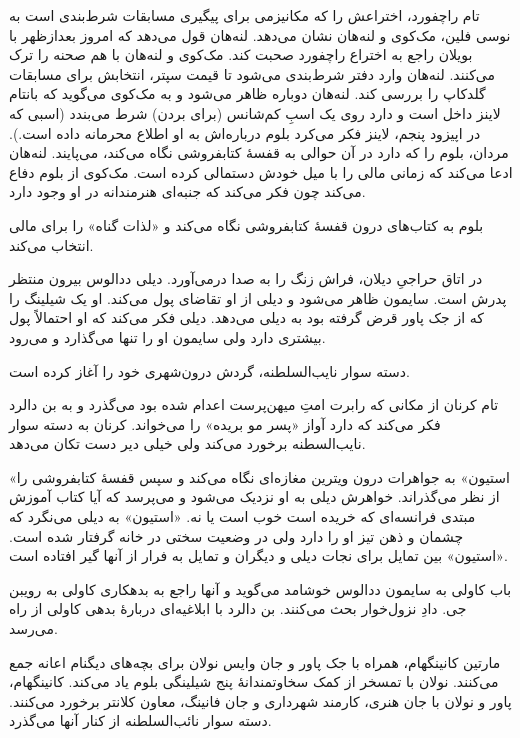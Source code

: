 \documentclass[12pt]{book}
\newcommand{\noun}[1]{«{#1}»}
\begin{document}
    تام راچفورد، اختراعش را که مکانیزمی برای پیگیری مسابقات شرط‌بندی است به نوسی فلین، مک‌کوی و لنه‌هان نشان می‌دهد. لنه‌هان قول می‌دهد که امروز بعدازظهر با  بویلان راجع به اختراع راچفورد صحبت کند. مک‌کوی و لنه‌هان با هم صحنه را ترک می‌کنند. لنه‌هان وارد دفتر شرط‌بندی می‌شود تا قیمت سپتر، انتخابش برای مسابقات گلدکاپ را بررسی کند. لنه‌هان دوباره ظاهر می‌شود و به مک‌کوی می‌گوید که بانتام لاینز داخل است و دارد روی یک اسبِ کم‌شانس (برای بردن) شرط می‌بندد (اسبی که در اپیزود پنجم، لاینز فکر می‌کرد بلوم درباره‌اش به او اطلاع محرمانه داده است.). مردان، بلوم را که دارد در آن حوالی به قفسۀ کتابفروشی نگاه می‌کند، می‌پایند. لنه‌هان ادعا می‌کند که زمانی مالی را با میل خودش دستمالی کرده است. مک‌کوی از بلوم دفاع می‌کند چون فکر می‌کند که جنبه‌ای هنرمندانه در او وجود دارد.

    بلوم به کتاب‌های درون قفسۀ کتابفروشی نگاه می‌کند و «لذات گناه» را برای مالی انتخاب می‌کند.

    در اتاق حراجیِ دیلان، فراش زنگ را به صدا درمی‌آورد. دیلی ددالوس بیرون منتظر پدرش است. سایمون ظاهر می‌شود و دیلی از او تقاضای پول می‌کند. او یک شیلینگ را که از جک پاور قرض گرفته بود به دیلی می‌دهد. دیلی فکر می‌کند که او احتمالاً پول بیشتری دارد ولی سایمون او را تنها می‌گذارد و می‌رود.

    دسته سوار نایب‌السلطنه، گردش درون‌شهری خود را آغاز کرده است.

    تام کرنان از مکانی که رابرت امتِ میهن‌پرست اعدام شده بود می‌گذرد و به بن دالرد فکر می‌کند که دارد آواز «پسر مو بریده» را می‌خواند. کرنان به دسته سوار نایب‌السطنه برخورد می‌کند ولی خیلی دیر دست تکان می‌دهد.

    \noun{استیون} به جواهرات درون ویترین مغازه‌ای نگاه می‌کند و سپس قفسۀ کتابفروشی را از نظر می‌گذراند. خواهرش دیلی به او نزدیک می‌شود و می‌پرسد که آیا کتاب آموزش مبتدی فرانسه‌ای که خریده است خوب است یا نه. \noun{استیون} به دیلی می‌نگرد که چشمان و ذهن تیز او را دارد ولی در وضعیت سختی در خانه گرفتار شده است. \noun{استیون} بین تمایل برای نجات دیلی و دیگران و تمایل به فرار از آنها گیر افتاده است.

    باب کاولی به سایمون ددالوس خوشامد می‌گوید و آنها راجع به بدهکاری کاولی به رویبن جی. دادِ نزول‌خوار بحث می‌کنند. بن دالرد با ابلاغیه‌ای دربارۀ بدهی کاولی از راه می‌رسد.

    مارتین کانینگهام، همراه با جک پاور و جان وایس نولان برای بچه‌های دیگنام اعانه جمع می‌کنند. نولان با تمسخر از کمک سخاوتمندانۀ پنج شیلینگی بلوم یاد می‌کند. کانینگهام، پاور و نولان با جان هنری، کارمند شهرداری و جان فانینگ، معاون کلانتر برخورد می‌کنند. دسته سوار نائب‌السلطنه از کنار آنها می‌گذرد.
\end{document}
